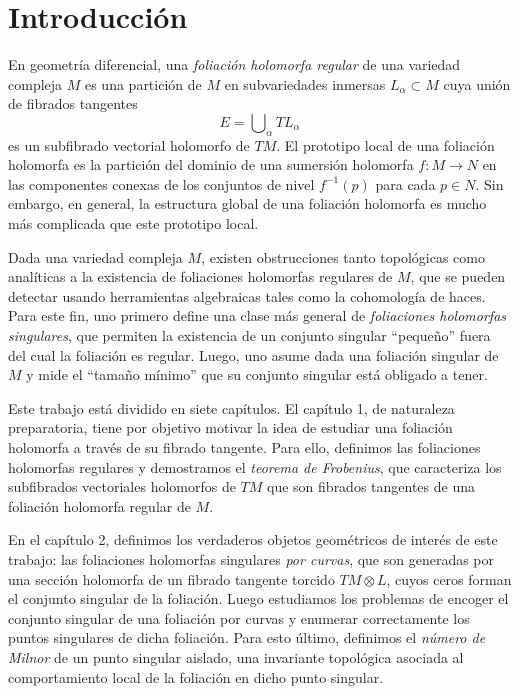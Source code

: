 \chapter*{Introducción}

En geometría diferencial, una \textit{foliación holomorfa regular} de una variedad compleja $M$ es una partición de $M$ en subvariedades inmersas $L_\alpha \subset M$ cuya unión de fibrados tangentes
$$E = \bigcup \nolimits_\alpha TL_\alpha$$
es un subfibrado vectorial holomorfo de $TM$. El prototipo local de una foliación holomorfa es la partición del dominio de una sumersión holomorfa $f : M \to N$ en las componentes conexas de los conjuntos de nivel $f^{-1}(p)$ para cada $p \in N$. Sin embargo, en general, la estructura global de una foliación holomorfa es mucho más complicada que este prototipo local.

Dada una variedad compleja $M$, existen obstrucciones tanto topológicas como analíticas a la existencia de foliaciones holomorfas regulares de $M$, que se pueden detectar usando herramientas algebraicas tales como la cohomología de haces. Para este fin, uno primero define una clase más general de \textit{foliaciones holomorfas singulares}, que permiten la existencia de un conjunto singular ``pequeño'' fuera del cual la foliación es regular. Luego, uno asume dada una foliación singular de $M$ y mide el ``tamaño mínimo'' que su conjunto singular está obligado a tener.

Este trabajo está dividido en siete capítulos. El capítulo 1, de naturaleza preparatoria, tiene por objetivo motivar la idea de estudiar una foliación holomorfa a través de su fibrado tangente. Para ello, definimos las foliaciones holomorfas regulares y demostramos el \textit{teorema de Frobenius}, que caracteriza los subfibrados vectoriales holomorfos de $TM$ que son fibrados tangentes de una foliación holomorfa regular de $M$.

En el capítulo 2, definimos los verdaderos objetos geométricos de interés de este trabajo: las foliaciones holomorfas singulares \textit{por curvas}, que son generadas por una sección holomorfa de un fibrado tangente torcido $TM \otimes L$, cuyos ceros forman el conjunto singular de la foliación. Luego estudiamos los problemas de encoger el conjunto singular de una foliación por curvas y enumerar correctamente los puntos singulares de dicha foliación. Para esto último, definimos el \textit{número de Milnor} de un punto singular aislado, una invariante topológica asociada al comportamiento local de la foliación en dicho punto singular.

